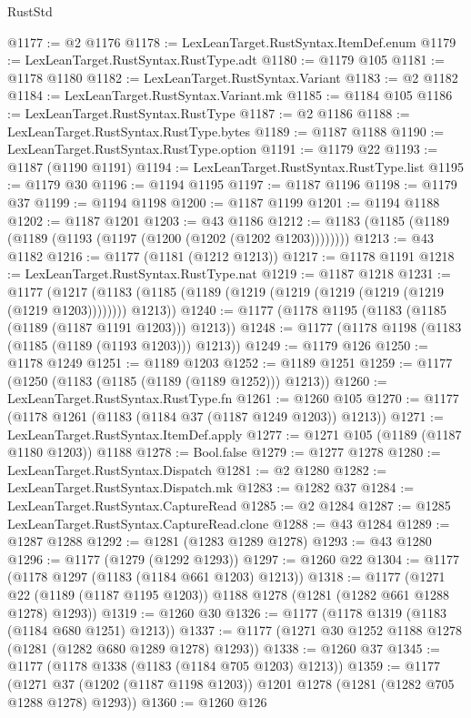 \begin{lexlean}{RustStd}
\begin{coremodule}
@1177 := @2 @1176
@1178 := LexLeanTarget.RustSyntax.ItemDef.enum
@1179 := LexLeanTarget.RustSyntax.RustType.adt
@1180 := @1179 @105
@1181 := @1178 @1180
@1182 := LexLeanTarget.RustSyntax.Variant
@1183 := @2 @1182
@1184 := LexLeanTarget.RustSyntax.Variant.mk
@1185 := @1184 @105
@1186 := LexLeanTarget.RustSyntax.RustType
@1187 := @2 @1186
@1188 := LexLeanTarget.RustSyntax.RustType.bytes
@1189 := @1187 @1188
@1190 := LexLeanTarget.RustSyntax.RustType.option
@1191 := @1179 @22
@1193 := @1187 (@1190 @1191)
@1194 := LexLeanTarget.RustSyntax.RustType.list
@1195 := @1179 @30
@1196 := @1194 @1195
@1197 := @1187 @1196
@1198 := @1179 @37
@1199 := @1194 @1198
@1200 := @1187 @1199
@1201 := @1194 @1188
@1202 := @1187 @1201
@1203 := @43 @1186
@1212 := @1183 (@1185 (@1189 (@1189 (@1193 (@1197 (@1200 (@1202 (@1202 @1203))))))))
@1213 := @43 @1182
@1216 := @1177 (@1181 (@1212 @1213))
@1217 := @1178 @1191
@1218 := LexLeanTarget.RustSyntax.RustType.nat
@1219 := @1187 @1218
@1231 := @1177
    (@1217 (@1183 (@1185 (@1189 (@1219 (@1219 (@1219 (@1219 (@1219 (@1219 @1203)))))))) @1213))
@1240 := @1177 (@1178 @1195 (@1183 (@1185 (@1189 (@1187 @1191 @1203))) @1213))
@1248 := @1177 (@1178 @1198 (@1183 (@1185 (@1189 (@1193 @1203))) @1213))
@1249 := @1179 @126
@1250 := @1178 @1249
@1251 := @1189 @1203
@1252 := @1189 @1251
@1259 := @1177 (@1250 (@1183 (@1185 (@1189 (@1189 @1252))) @1213))
@1260 := LexLeanTarget.RustSyntax.RustType.fn
@1261 := @1260 @105
@1270 := @1177 (@1178 @1261 (@1183 (@1184 @37 (@1187 @1249 @1203)) @1213))
@1271 := LexLeanTarget.RustSyntax.ItemDef.apply
@1277 := @1271 @105 (@1189 (@1187 @1180 @1203)) @1188
@1278 := Bool.false
@1279 := @1277 @1278
@1280 := LexLeanTarget.RustSyntax.Dispatch
@1281 := @2 @1280
@1282 := LexLeanTarget.RustSyntax.Dispatch.mk
@1283 := @1282 @37
@1284 := LexLeanTarget.RustSyntax.CaptureRead
@1285 := @2 @1284
@1287 := @1285 LexLeanTarget.RustSyntax.CaptureRead.clone
@1288 := @43 @1284
@1289 := @1287 @1288
@1292 := @1281 (@1283 @1289 @1278)
@1293 := @43 @1280
@1296 := @1177 (@1279 (@1292 @1293))
@1297 := @1260 @22
@1304 := @1177 (@1178 @1297 (@1183 (@1184 @661 @1203) @1213))
@1318 := @1177
    (@1271 @22 (@1189 (@1187 @1195 @1203)) @1188 @1278 (@1281 (@1282 @661 @1288 @1278) @1293))
@1319 := @1260 @30
@1326 := @1177 (@1178 @1319 (@1183 (@1184 @680 @1251) @1213))
@1337 := @1177 (@1271 @30 @1252 @1188 @1278 (@1281 (@1282 @680 @1289 @1278) @1293))
@1338 := @1260 @37
@1345 := @1177 (@1178 @1338 (@1183 (@1184 @705 @1203) @1213))
@1359 := @1177
    (@1271 @37 (@1202 (@1187 @1198 @1203)) @1201 @1278 (@1281 (@1282 @705 @1288 @1278) @1293))
@1360 := @1260 @126

\end{coremodule}
\end{lexlean}
